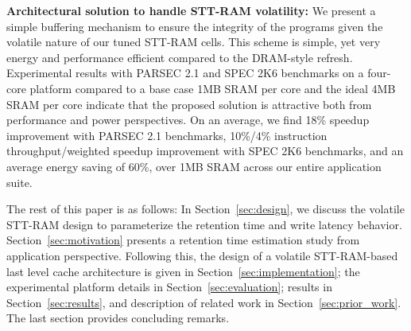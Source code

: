 \noindent\textbf{Architectural solution to handle STT-RAM volatility:} We present a simple buffering
mechanism to ensure the integrity of the programs given the volatile nature of our tuned STT-RAM cells.
This scheme is simple, yet very energy and performance efficient compared to the DRAM-style refresh.
Experimental results with PARSEC 2.1 and SPEC 2K6 benchmarks on a four-core platform
compared to a base case 1MB SRAM per core and the ideal 4MB SRAM per core indicate that the proposed
solution is attractive both from performance and power perspectives. On an average, we find 18\% speedup
improvement with PARSEC 2.1 benchmarks, 10\%/4\% instruction throughput/weighted speedup improvement
with SPEC 2K6 benchmarks, and an average energy saving of 60\%, over 1MB SRAM across our entire application suite.




The rest of this paper is as follows: In Section~\ref{sec:design}, we discuss the volatile STT-RAM design to
parameterize the retention time and write latency behavior. Section~\ref{sec:motivation} presents a retention time
estimation study from application perspective. Following this, the design of a volatile STT-RAM-based last
level cache architecture is given in Section~\ref{sec:implementation}; the experimental platform details in Section~\ref{sec:evaluation};
results in Section~\ref{sec:results}, and description of related work in Section~\ref{sec:prior_work}.
The last section provides concluding remarks.



